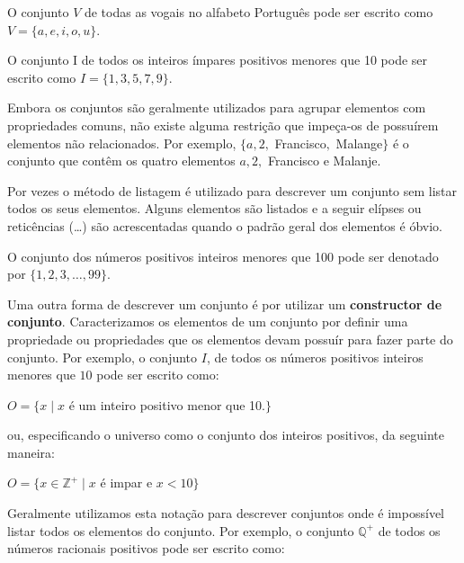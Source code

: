 \label{exem31}
\begin{exmp}
O conjunto $V$ de todas as vogais no alfabeto Português pode ser escrito como $V
= \{a,e,i,o,u\}$.
\end{exmp}
\label{exem32}
\begin{exmp}
O conjunto I de todos os inteiros ímpares positivos menores que 10 pode ser
escrito como $I=\{1,3,5,7,9\}$.
\end{exmp}
\label{exem33}
\begin{exmp}
Embora os conjuntos são geralmente utilizados para agrupar elementos com
propriedades comuns, não existe alguma restrição que impeça-os de possuírem
elementos não relacionados. Por exemplo, $\{a, 2,$ Francisco$,$ Malange$\}$ é o
conjunto que contêm os quatro elementos $a, 2,$ Francisco e Malanje.
\end{exmp}

Por vezes o método de listagem é utilizado para descrever um conjunto sem listar
todos os seus elementos. Alguns elementos são listados e a seguir elípses ou
reticências (\ldots) são acrescentadas quando o padrão geral dos elementos é
óbvio.

\label{exem34}
\begin{exmp}
O conjunto dos números positivos inteiros menores que 100 pode ser denotado por
$\{1,2,3,\ldots,99\}$.
\end{exmp}

Uma outra forma de descrever um conjunto é por utilizar um \textbf{constructor
de conjunto}. Caracterizamos os elementos de um conjunto por definir uma
propriedade ou propriedades que os elementos devam possuír para fazer parte do
conjunto. Por exemplo, o conjunto $I$, de todos os números positivos inteiros
menores que $10$ pode ser escrito como:

\begin{center}$O = \{x \mid x$ é um inteiro positivo menor que 10.$\}$\end{center}

\noindent ou, especificando o universo como o conjunto dos inteiros positivos,
da seguinte maneira:

\begin{center}$O = \{x \in \mathbb{Z}^{+} \mid x$ é impar e $x < 10\}$\end{center}

Geralmente utilizamos esta notação para descrever conjuntos onde é impossível
listar todos os elementos do conjunto. Por exemplo, o conjunto $\mathbb{Q}^{+}$
de todos os números racionais positivos pode ser escrito como:

